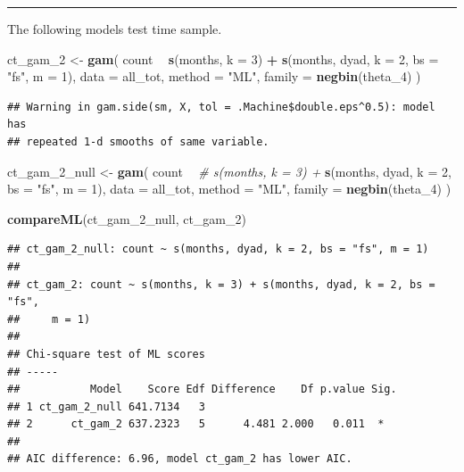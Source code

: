 \documentclass[]{article}
\newenvironment{Shaded}{\begin{snugshade}}{\end{snugshade}}
\newcommand{\CommentTok}[1]{\textcolor[rgb]{0.56,0.35,0.01}{\textit{#1}}}
\newcommand{\DataTypeTok}[1]{\textcolor[rgb]{0.13,0.29,0.53}{#1}}
\newcommand{\DecValTok}[1]{\textcolor[rgb]{0.00,0.00,0.81}{#1}}
\newcommand{\KeywordTok}[1]{\textcolor[rgb]{0.13,0.29,0.53}{\textbf{#1}}}
\newcommand{\NormalTok}[1]{#1}
\newcommand{\OperatorTok}[1]{\textcolor[rgb]{0.81,0.36,0.00}{\textbf{#1}}}
\newcommand{\StringTok}[1]{\textcolor[rgb]{0.31,0.60,0.02}{#1}}
\begin{document}
\begin{center}\rule{0.5\linewidth}{\linethickness}\end{center}

The following models test time sample.

\begin{Shaded}
\begin{Highlighting}[]
\NormalTok{ct_gam_}\DecValTok{2}\NormalTok{ <-}\StringTok{ }\KeywordTok{gam}\NormalTok{(}
\NormalTok{  count }\OperatorTok{~}
\StringTok{    }\KeywordTok{s}\NormalTok{(months, }\DataTypeTok{k =} \DecValTok{3}\NormalTok{) }\OperatorTok{+}
\StringTok{    }\KeywordTok{s}\NormalTok{(months, dyad, }\DataTypeTok{k =} \DecValTok{2}\NormalTok{, }\DataTypeTok{bs =} \StringTok{"fs"}\NormalTok{, }\DataTypeTok{m =} \DecValTok{1}\NormalTok{),}
  \DataTypeTok{data =}\NormalTok{ all_tot,}
  \DataTypeTok{method =} \StringTok{"ML"}\NormalTok{,}
  \DataTypeTok{family =} \KeywordTok{negbin}\NormalTok{(theta_}\DecValTok{4}\NormalTok{)}
\NormalTok{)}
\end{Highlighting}
\end{Shaded}

\begin{verbatim}
## Warning in gam.side(sm, X, tol = .Machine$double.eps^0.5): model has
## repeated 1-d smooths of same variable.
\end{verbatim}

\begin{Shaded}
\begin{Highlighting}[]
\NormalTok{ct_gam_}\DecValTok{2}\NormalTok{_null <-}\StringTok{ }\KeywordTok{gam}\NormalTok{(}
\NormalTok{  count }\OperatorTok{~}
\StringTok{    }\CommentTok{# s(months, k = 3) +}
\StringTok{    }\KeywordTok{s}\NormalTok{(months, dyad, }\DataTypeTok{k =} \DecValTok{2}\NormalTok{, }\DataTypeTok{bs =} \StringTok{"fs"}\NormalTok{, }\DataTypeTok{m =} \DecValTok{1}\NormalTok{),}
  \DataTypeTok{data =}\NormalTok{ all_tot,}
  \DataTypeTok{method =} \StringTok{"ML"}\NormalTok{,}
  \DataTypeTok{family =} \KeywordTok{negbin}\NormalTok{(theta_}\DecValTok{4}\NormalTok{)}
\NormalTok{)}

\KeywordTok{compareML}\NormalTok{(ct_gam_}\DecValTok{2}\NormalTok{_null, ct_gam_}\DecValTok{2}\NormalTok{)}
\end{Highlighting}
\end{Shaded}

\begin{verbatim}
## ct_gam_2_null: count ~ s(months, dyad, k = 2, bs = "fs", m = 1)
## 
## ct_gam_2: count ~ s(months, k = 3) + s(months, dyad, k = 2, bs = "fs", 
##     m = 1)
## 
## Chi-square test of ML scores
## -----
##           Model    Score Edf Difference    Df p.value Sig.
## 1 ct_gam_2_null 641.7134   3                              
## 2      ct_gam_2 637.2323   5      4.481 2.000   0.011  *  
## 
## AIC difference: 6.96, model ct_gam_2 has lower AIC.
\end{verbatim}
\end{document}
